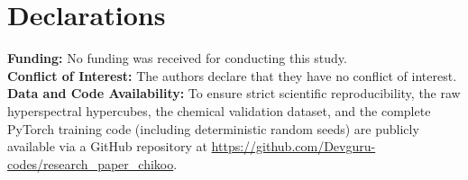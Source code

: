 \documentclass[pdflatex,sn-mathphys-num]{sn-jnl}
\begin{document}
\section*{Declarations}
\textbf{Funding:} No funding was received for conducting this study. \\
\textbf{Conflict of Interest:} The authors declare that they have no conflict of interest. \\
\textbf{Data and Code Availability:} To ensure strict scientific reproducibility, the raw hyperspectral hypercubes, the chemical validation dataset, and the complete PyTorch training code (including deterministic random seeds) are publicly available via a GitHub repository at \url{https://github.com/Devguru-codes/research_paper_chikoo}.

\nocite{*}

\end{document}
